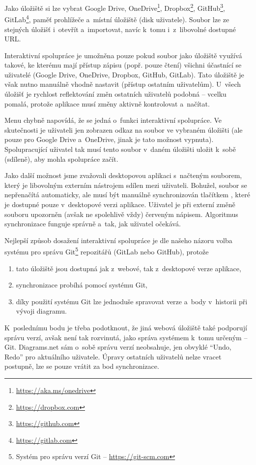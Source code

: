 Jako úložiště si lze vybrat Google Drive,
OneDrive\footnote{\url{https://aka.ms/onedrive}},
Dropbox\footnote{\url{https://dropbox.com}},
GitHub\footnote{\url{https://github.com}},
GitLab\footnote{\url{https://gitlab.com}},
paměť prohlížeče a~místní úložiště (disk uživatele).
Soubor lze ze stejných úložišť i~otevřít a~importovat, navíc k~tomu i~z~libovolné dostupné URL.

Interaktivní spolupráce je umožněna pouze pokud soubor jako úložiště využívá takové, ke kterému mají přístup zápisu (popř. pouze čtení) všichni účastnící se uživatelé (Google Drive, OneDrive, Dropbox, GitHub, GitLab).
Tato úložiště je však nutno manuálně vhodně nastavit (přístup ostatním uživatelům).
U~všech úložišť je rychlost reflektování změn ostatních uživatelů podobná -- vcelku pomalá, protože aplikace musí změny aktivně kontrolovat a~načítat.

Menu  chybně napovídá, že se jedná o~funkci interaktivní spolupráce.
Ve skutečnosti je uživateli jen zobrazen odkaz na soubor ve vybraném úložišti (ale pouze pro Google Drive a~OneDrive, jinak je tato možnost vypnuta).
Spolupracující uživatel tak musí tento soubor v~daném úložišti uložit k~sobě (sdíleně), aby mohla spolupráce začít.

Jako další možnost jsme zvažovali desktopovou aplikaci s~načteným souborem, který je libovolným externím nástrojem sdílen mezi uživateli.
Bohužel, soubor se nepřenačítá automaticky, ale musí být manuálně synchronizován tlačítkem , které je dostupné pouze v~desktopové verzi aplikace.
Uživatel je při externí změně souboru upozorněn (avšak ne spolehlivě vždy) červeným nápisem.
Algoritmus synchronizace funguje správně a~tak, jak uživatel očekává.

Nejlepší způsob dosažení interaktivní spolupráce je dle našeho názoru volba systému pro správu Git\footnote{Systém pro správu verzí Git -- \url{https://git-scm.com}} repozitářů (GitLab nebo GitHub), protože
\begin{enumerate}
  \item tato úložiště jsou dostupná jak z~webové, tak z~desktopové verze aplikace,
  \item synchronizace probíhá pomocí systému Git,
  \item díky použití systému Git lze jednoduše spravovat verze a~body v~historii při vývoji diagramu.
\end{enumerate}

K~poslednímu bodu je třeba podotknout, že jiná webová úložiště také podporují správu verzí, avšak není tak rozvinutá, jako správa systémem k~tomu určeným -- Git.
Diagrams.net sám o~sobě správu verzí neobsahuje, jen obvyklé ``Undo, Redo'' pro aktuálního uživatele.
Úpravy ostatních uživatelů nelze vracet postupně, lze se pouze vrátit za bod synchronizace.

